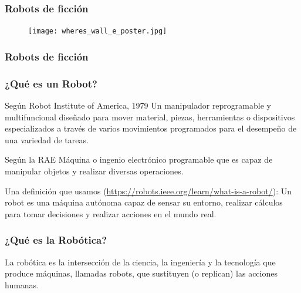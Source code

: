 \begin{frame}
	\frametitle{Robots de ficción}
	\begin{figure}[!h]
		\texttt{[image: wheres\_wall\_e\_poster.jpg]}
     \end{figure}
\end{frame}

\begin{frame}
	\frametitle{Robots de ficción}
\end{frame}

\begin{frame}
	\frametitle{¿Qué es un Robot?}
	
	\begin{block}{Según Robot Institute of America, 1979}
		Un manipulador reprogramable y multifuncional diseñado para mover material, piezas, herramientas o dispositivos especializados a través de varios movimientos programados para el desempeño de una variedad de tareas.
	\end{block}
	
	\begin{block}{Según la RAE}
		Máquina o ingenio electrónico programable que es capaz de manipular objetos y realizar diversas operaciones.
	\end{block}
	
	\begin{block}{Una definición que usamos (\url{https://robots.ieee.org/learn/what-is-a-robot/}):}
		Un robot es una máquina autónoma capaz de sensar su entorno, realizar cálculos para tomar decisiones y realizar acciones en el mundo real.
	\end{block}
	
\end{frame}

\begin{frame}
	\frametitle{¿Qué es la Robótica?}
	La robótica es la intersección de la ciencia, la ingeniería y la tecnología que produce máquinas, llamadas robots, que sustituyen (o replican) las acciones humanas.
\end{frame}


